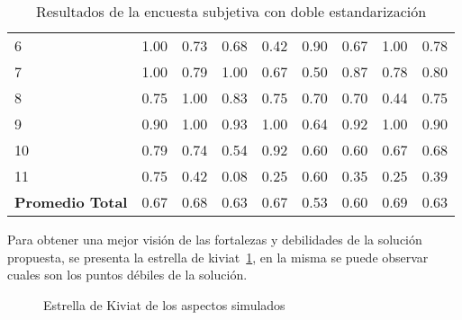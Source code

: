 \begin{table}[!hbt]
\begin{tabular}{lrrrrrrrr}
6              & 1.00 & 0.73 & 0.68 & 0.42 & 0.90 & 0.67 & 1.00 & 0.78 \\
7              & 1.00 & 0.79 & 1.00 & 0.67 & 0.50 & 0.87 & 0.78 & 0.80 \\
8              & 0.75 & 1.00 & 0.83 & 0.75 & 0.70 & 0.70 & 0.44 & 0.75 \\
9              & 0.90 & 1.00 & 0.93 & 1.00 & 0.64 & 0.92 & 1.00 & 0.90 \\
10             & 0.79 & 0.74 & 0.54 & 0.92 & 0.60 & 0.60 & 0.67 & 0.68 \\
11             & 0.75 & 0.42 & 0.08 & 0.25 & 0.60 & 0.35 & 0.25 & 0.39 \\
\midrule
\textbf{Promedio Total} & 0.67 & 0.68 & 0.63 & 0.67 & 0.53 & 0.60 & 0.69 & 0.63 \\
\bottomrule
\end{tabular}
\caption{Resultados de la encuesta subjetiva con doble estandarización}
\label{tab:subjetiva_conformidad_corregida}
\end{table}

Para obtener una mejor visión de las fortalezas y debilidades de la solución
propuesta, se presenta la estrella de kiviat~\ref{fig:subjetiva_kiviat}, en la
misma se puede observar cuales son los puntos débiles de la solución.

\begin{figure}[!ht]
\label{fig:subjetiva_kiviat}
\caption{Estrella de Kiviat de los aspectos simulados}
\end{figure}
